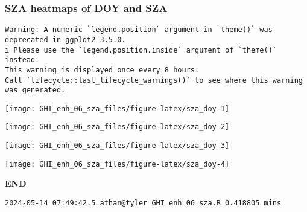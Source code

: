 \documentclass[
  10pt,
  a4paper,oneside]{article}
\begin{document}
\hypertarget{sza-heatmaps-of-doy-and-sza}{%
\subsubsection{SZA heatmaps of DOY and SZA}\label{sza-heatmaps-of-doy-and-sza}}

\begin{verbatim}
Warning: A numeric `legend.position` argument in `theme()` was deprecated in ggplot2 3.5.0.
i Please use the `legend.position.inside` argument of `theme()` instead.
This warning is displayed once every 8 hours.
Call `lifecycle::last_lifecycle_warnings()` to see where this warning was generated.
\end{verbatim}

\begin{center}\texttt{[image: GHI\_enh\_06\_sza\_files/figure-latex/sza\_doy-1]} \end{center}

\begin{center}\texttt{[image: GHI\_enh\_06\_sza\_files/figure-latex/sza\_doy-2]} \end{center}

\begin{center}\texttt{[image: GHI\_enh\_06\_sza\_files/figure-latex/sza\_doy-3]} \end{center}

\begin{center}\texttt{[image: GHI\_enh\_06\_sza\_files/figure-latex/sza\_doy-4]} \end{center}

\textbf{END}

\begin{verbatim}
2024-05-14 07:49:42.5 athan@tyler GHI_enh_06_sza.R 0.418805 mins
\end{verbatim}
\end{document}

